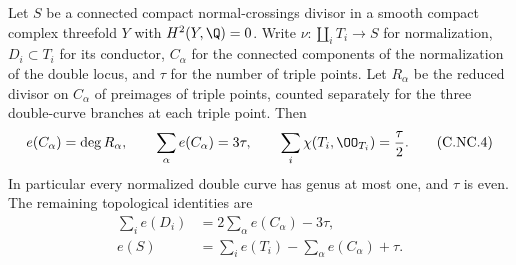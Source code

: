 
\begin{proposition}\label{cdp:st:C.2.NC.2}
Let $S$ be a connected compact normal-crossings divisor in a smooth compact complex threefold $Y$ with $H^2(Y,\Q)=0$. Write $\nu:\coprod_iT_i\to S$ for normalization, $D_i\subset T_i$ for its conductor, $C_\alpha$ for the connected components of the normalization of the double locus, and $\tau$ for the number of triple points. Let $R_\alpha$ be the reduced divisor on $C_\alpha$ of preimages of triple points, counted separately for the three double-curve branches at each triple point. Then
\[
 e(C_\alpha)=\deg R_\alpha,\qquad
 \sum_\alpha e(C_\alpha)=3\tau,
 \qquad
 \sum_i\chi(T_i,\OO_{T_i})=\frac{\tau}{2}.
 \tag{C.NC.4}\label{cdp:eq:C.NC.4}
\]
In particular every normalized double curve has genus at most one, and $\tau$ is even. The remaining topological identities are
\[
\begin{aligned}
 \sum_i e(D_i)&=2\sum_\alpha e(C_\alpha)-3\tau,\\
 e(S)&=\sum_i e(T_i)-\sum_\alpha e(C_\alpha)+\tau.
\end{aligned}
 \tag{C.NC.5}\label{cdp:eq:C.NC.5}
\]
\end{proposition}
